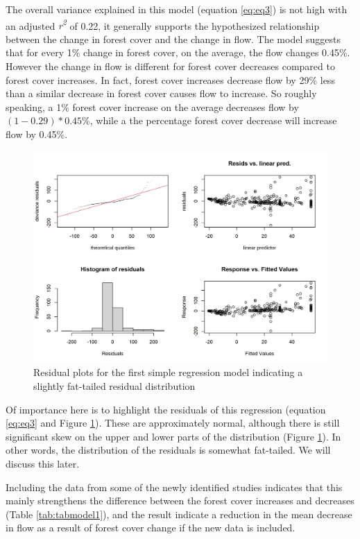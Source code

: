 \documentclass[]{elsarticle} %
\begin{document}
The overall variance explained in this model (equation \eqref{eq:eq3}) is not high with an adjusted \emph{r\textsuperscript{2}} of 0.22, it generally supports the hypothesized relationship between the change in forest cover and the change in flow. The model suggests that for every 1\% change in forest cover, on the average, the flow changes 0.45\%. However the change in flow is different for forest cover decreases compared to forest cover increases. In fact, forest cover increases decrease flow by 29\% less than a similar decrease in forest cover causes flow to increase. So roughly speaking, a 1\% forest cover increase on the average decreases flow by \((1 - 0.29)*0.45\%\), while a the percentage forest cover decrease will increase flow by 0.45\%.

\begin{figure}
\includegraphics[width=0.9\linewidth]{residual_plot_model1} \caption{Residual plots for the first simple regression model indicating a slightly fat-tailed residual distribution}\label{fig:gamcheck}
\end{figure}

Of importance here is to highlight the residuals of this regression (equation \eqref{eq:eq3} and Figure \ref{fig:gamcheck}). These are approximately normal, although there is still significant skew on the upper and lower parts of the distribution (Figure \ref{fig:gamcheck}). In other words, the distribution of the residuals is somewhat fat-tailed. We will discuss this later.

Including the data from some of the newly identified studies indicates that this mainly strengthens the difference between the forest cover increases and decreases (Table \ref{tab:tabmodel1}), and the result indicate a reduction in the mean decrease in flow as a result of forest cover change if the new data is included.
\end{document}
